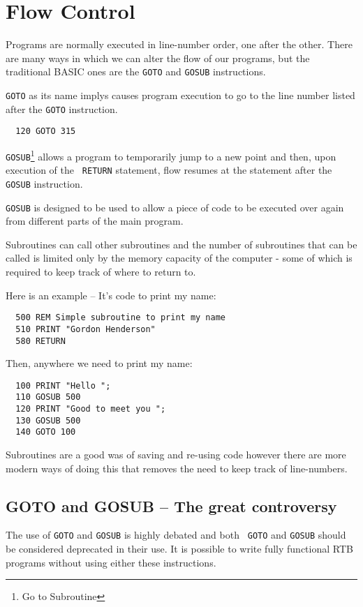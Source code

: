 \chapter{Flow Control}
Programs are normally executed in line-number order, one after the other.
There are many ways in which we can alter the flow of our programs, but
the traditional BASIC ones are the {\tt GOTO} and {\tt GOSUB}
instructions.

{\tt GOTO} as its name implys causes program execution to go to the line
number listed after the {\tt GOTO} instruction.
\begin{verbatim}
  120 GOTO 315
\end{verbatim}

{\tt GOSUB}\footnote{Go to Subroutine} allows a program to
temporarily jump to a new point and then, upon execution of the {\tt
RETURN} statement, flow resumes at the statement after the {\tt GOSUB}
instruction.

{\tt GOSUB} is designed to be used to allow a piece of code to be executed
over again from different parts of the main program.

Subroutines can call other subroutines and the number of subroutines that
can be called is limited only by the memory capacity of the computer -
some of which is required to keep track of where to return to.

Here is an example -- It's code to print my name:
\begin{verbatim}
  500 REM Simple subroutine to print my name
  510 PRINT "Gordon Henderson"
  580 RETURN
\end{verbatim}
Then, anywhere we need to print my name:
\begin{verbatim}
  100 PRINT "Hello ";
  110 GOSUB 500
  120 PRINT "Good to meet you ";
  130 GOSUB 500
  140 GOTO 100
\end{verbatim}

Subroutines are a good was of saving and re-using code however there
are more modern ways of doing this that removes the need to keep track
of line-numbers.

\section{GOTO and GOSUB -- The great controversy}
The use of {\tt GOTO} and {\tt GOSUB} is highly debated and both {\tt
GOTO} and {\tt GOSUB} should be considered deprecated in their use. It
is possible to write fully functional RTB programs without using either
these instructions.

